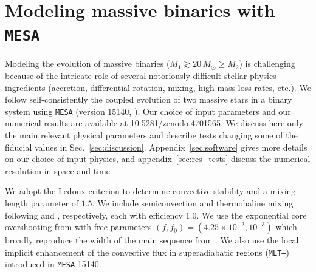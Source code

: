 \documentclass[twocolumn,twocolappendix,trackchanges]{aastex63}
\DeclareRobustCommand{\Secref}[1]{Sec.~\ref{#1}}
\begin{document}
\section{Modeling massive binaries with \texttt{MESA}}
\label{sec:methods}

Modeling the evolution of massive binaries
($M_1\gtrsim 20\,M_\odot \geq M_2$) is challenging because of the
intricate role of several notoriously difficult stellar physics
ingredients (accretion, differential rotation, mixing, high mass-loss
rates, etc.). We follow self-consistently the coupled evolution
of two massive stars in a binary system using \texttt{MESA} (version
15140, \citealt{paxton:11, paxton:13, paxton:15, paxton:18,
  paxton:19}). Our choice of input parameters and our numerical
results are available at \url{10.5281/zenodo.4701565}. We discuss here
only the main relevant physical parameters and describe tests changing
some of the fiducial values in
\Secref{sec:discussion}. Appendix~\ref{sec:software} gives more
details on our choice of input physics, and
appendix~\ref{sec:res_tests} discuss the numerical resolution in space
and time.

We adopt the Ledoux criterion to determine convective stability and a
mixing length parameter of $1.5$. We include semiconvection and
thermohaline mixing following \cite{langer:83} and
\cite{kippenhahn:80}, respectively, each with efficiency $1.0$. We use the exponential core overshooting from \cite{herwig:00}
with free parameters $(f, f_0)=(4.25\times10^{-2}, 10^{-3})$
\citep{claret:17} which broadly reproduce the width of the main
sequence from \cite{brott:11}. We also use the local implicit
enhancement of the convective flux in superadiabatic regions
(\texttt{MLT--}) introduced in \texttt{MESA}
15140.
\end{document}

